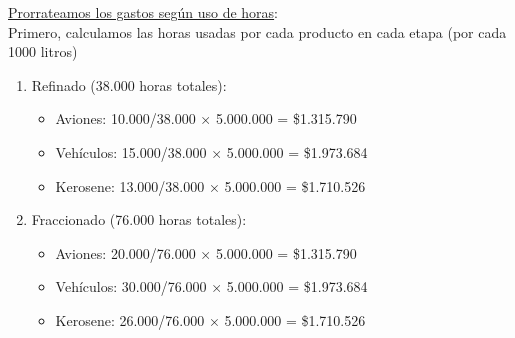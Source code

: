 \documentclass[10pt,a4paper]{article}
\begin{document}
\begin{enumerate}
\begin{itemize}
    \end{itemize}

    \underline{Prorrateamos los gastos según uso de horas}: \\

    Primero, calculamos las horas usadas por cada producto en cada etapa (por cada 1000 litros)

    \begin{center}
    \end{center}

    \clearpage

    \begin{enumerate}[label=\alph*)]

        \item Refinado (38.000 horas totales):
        
        \begin{itemize}

            \item Aviones: 10.000/38.000 × 5.000.000 = \$1.315.790
            \item Vehículos: 15.000/38.000 × 5.000.000 = \$1.973.684
            \item Kerosene: 13.000/38.000 × 5.000.000 = \$1.710.526 \\
    
        \end{itemize}

        \item Fraccionado (76.000 horas totales):
        
        \begin{itemize}

            \item Aviones: 20.000/76.000 × 5.000.000 = \$1.315.790
            \item Vehículos: 30.000/76.000 × 5.000.000 = \$1.973.684
            \item Kerosene: 26.000/76.000 × 5.000.000 = \$1.710.526 \\
    

\end{itemize}
\end{enumerate}
\end{enumerate}
\end{document}
